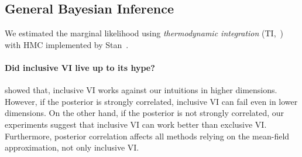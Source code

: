 \subsection{General Bayesian Inference}
We estimated the marginal likelihood using \textit{thermodynamic integration} (TI,~\citealt{gelman_simulating_1998, neal_annealed_2001, lartillot_computing_2006}) with HMC implemented by Stan~\citep{carpenter_stan_2017, betancourt_conceptual_2017}.

\paragraph{Did inclusive VI live up to its hype?}
\citet{dhaka_challenges_2021} showed that, inclusive VI works against our intuitions in higher dimensions.
However, if the posterior is strongly correlated, inclusive VI can fail even in lower dimensions.
On the other hand, if the posterior is not strongly correlated, our experiments suggest that inclusive VI can work better than exclusive VI.
Furthermore, posterior correlation affects all methods relying on the mean-field approximation, not only inclusive VI.

